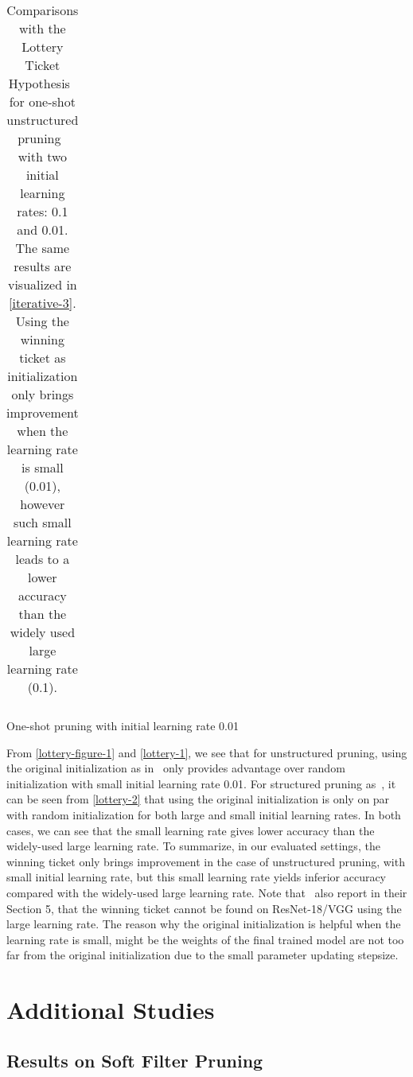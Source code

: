 \begin{table}[!htbp]
\begin{subtable}[b]{\textwidth}
\begin{tabular}{c|c|cccc}
\end{tabular}
\caption{One-shot pruning with initial learning rate 0.01}
\label{subtable-4}
\end{subtable}
\caption{Comparisons with the Lottery Ticket Hypothesis~\cite{lottery} for one-shot unstructured  pruning~\cite{han2015learning} with two initial learning rates: 0.1 and 0.01. The same results are visualized in \autoref{iterative-3}. Using the winning ticket as initialization only brings improvement when the learning rate is small (0.01), however such small learning rate leads to a lower accuracy than the widely used large learning rate (0.1).}
\label{lottery-1}
\end{table}





From \autoref{lottery-figure-1} and \autoref{lottery-1}, we see that for unstructured  pruning, using the original initialization as in~\cite{lottery} only provides advantage over random initialization with small initial learning rate 0.01. For structured pruning as~\cite{li2016pruning}, it can be seen from \autoref{lottery-2} that using the original initialization is only on par with random initialization for both large and small initial learning rates. In both cases, we can see that the small learning rate gives lower accuracy than the widely-used large learning rate. To summarize, in our evaluated settings, the winning ticket only brings improvement in the case of unstructured pruning, with small initial learning rate, but this small learning rate yields inferior accuracy compared with the widely-used large learning rate. Note that~\cite{lottery} also report in their Section 5, that the winning ticket cannot be found on ResNet-18/VGG using the large learning rate. The reason why the original initialization is helpful when the learning rate is small, might be the weights of the final trained model are not too far from the original initialization due to the small parameter updating stepsize.



\section{Additional Studies}
\subsection{Results on Soft Filter Pruning}
\label{sec:sfp}

